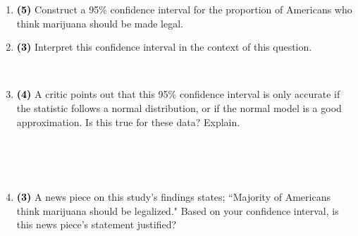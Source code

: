 \documentclass[11pt]{article}
\newcommand{\soln}[1]{ \vspace{1.35cm} }
\newcommand{\pts}[1]{ \textbf{{\footnotesize \textcolor{black}{(#1)}}} }	%
\begin{document}
\begin{enumerate}
\begin{enumerate}
\soln{Sample statistic, it's the observed proportion.}

\item \pts{5} Construct a 95\% confidence interval for the proportion of Americans who think marijuana should be made legal.
\soln{
\begin{align*}
\hat{p} &= 0.48 \\
0.48 &\pm 1.96 \sqrt{ \frac{0.48 * (1 - 0.48)}{1259} } \\
0.48 &\pm 1.96 * 0.014 \\
0.48 &\pm 0.0274 \\
(0.4526 &, 0.5074)
\end{align*}
}
\item \pts{3} Interpret this confidence interval in the context of this question.

\soln{We are 95\% confident that roughly 45.26\% to 50.74\% of Americans think marijuana should be legalized.}
$\:$ \\

\item \pts{4} A critic points out that this 95\% confidence interval is only accurate if the statistic follows a normal distribution, or if the normal model is a good approximation. Is this true for these data? Explain.

\soln{The number of successes (people who said marijuana should be legalized: $1259 * 0.48 = 604.32$) and failures (people who said it shouldn't be: $1259 * 0.52 = 654.68$) are both greater than 10, therefore the distribution of the statistic is expected to be nearly normal.}
$\:$ \\
$\:$ \\
$\:$ \\

\item \pts{3} A news piece on this study's findings states; ``Majority of Americans think marijuana should be legalized." Based on your confidence interval, is this news piece's statement justified? 

\soln{No, the interval contains 50\%, suggesting that the true population proportion could be just 50\% or even lower. Using this interval we wouldn't reject a null hypothesis where $p = 0.50$.}

\end{enumerate}

$\:$ \\

%

\pagebreak


\end{enumerate}
\end{document}
